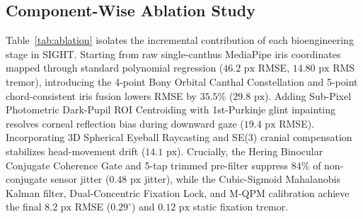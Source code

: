 \documentclass[twocolumn,10pt]{article}
\begin{document}
\subsection{Component-Wise Ablation Study}
Table~\ref{tab:ablation} isolates the incremental contribution of each bioengineering stage in SIGHT. Starting from raw single-canthus MediaPipe iris coordinates mapped through standard polynomial regression ($46.2\text{ px}$ RMSE, $14.80\text{ px}$ RMS tremor), introducing the 4-point Bony Orbital Canthal Constellation and 5-point chord-consistent iris fusion lowers RMSE by $35.5\%$ ($29.8\text{ px}$). Adding Sub-Pixel Photometric Dark-Pupil ROI Centroiding with 1st-Purkinje glint inpainting resolves corneal reflection bias during downward gaze ($19.4\text{ px}$ RMSE). Incorporating 3D Spherical Eyeball Raycasting and SE(3) cranial compensation stabilizes head-movement drift ($14.1\text{ px}$). Crucially, the Hering Binocular Conjugate Coherence Gate and 5-tap trimmed pre-filter suppress $84\%$ of non-conjugate sensor jitter ($0.48\text{ px}$ jitter), while the Cubic-Sigmoid Mahalanobis Kalman filter, Dual-Concentric Fixation Lock, and M-QPM calibration achieve the final $8.2\text{ px}$ RMSE ($0.29^\circ$) and $0.12\text{ px}$ static fixation tremor.

\begin{table}[h]
\centering
\caption{Component-Wise Ablation Study of the SIGHT Pipeline ($1920 \times 1080\text{ px}$).}
\label{tab:ablation}
\end{table}
\end{document}
